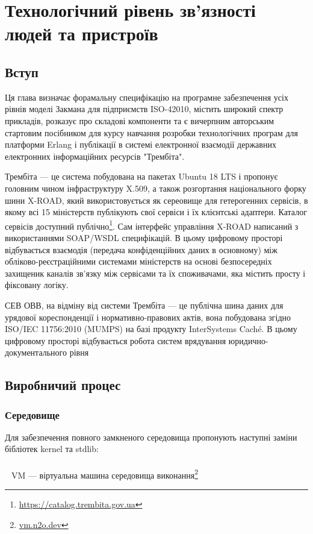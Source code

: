 \chapter{Технологічний рівень зв'язності людей та пристроїв}

\section{Вступ}

Ця глава визначає форамальну специфікацію на програмне забезпечення усіх рівнів моделі Закмана
для підприємств ISO-42010, містить широкий спектр прикладів, розказує про складові компоненти
та є вичерпним авторським стартовим посібником для курсу навчання розробки
технологічних програм для платформи Erlang і публікації в системі електронної взаємодії
державних електронних інформаційних ресурсів "Трембіта".

Трембіта — це система побудована на пакетах Ubuntu 18 LTS і пропонує головним чином
інфраструктуру X.509, а також розгортання національного форку шини X-ROAD,
який використовується як сереовище для гетерогенних сервісів, в якому всі 15 міністерств
публікують свої сервіси і їх клієнтські адаптери. Каталог сервісів доступний
публічно\footnote{\url{https://catalog.trembita.gov.ua}}. Сам інтерфейс управління X-ROAD
написаний з використаннями SOAP/WSDL специфікацій. В цьому цифровому просторі відбувається
взаємодія (передача конфіденційних даних в основному) між обліково-реєстраційними системами
міністерств на основі безпосередніх захищеник каналів зв'язку між сервісами та їх споживачами,
яка містить просту і фіксовану логіку.

СЕВ ОВВ, на відміну від системи Трембіта — це публічна шина даних для
урядової кореспонденції і нормативно-правових актів, вона побудована
згідно ISO/IEC 11756:2010 (MUMPS) на базі продукту InterSystems Caché.
В цьому цифровому просторі відбувається робота систем врядування
юридично-документального рівня

\section{Виробничий процес}

\subsection{Середовище}

Для забезпечення повного замкненого середовища пропонують наступні заміни бібліотек kernel та stdlib: \\
\\ \indent
\setmainfont{Segoe UI Emoji}🚀\setmainfont{Geometria}\ VM --- віртуальна машина середовища виконання\footnote{\url{vm.n2o.dev}}


